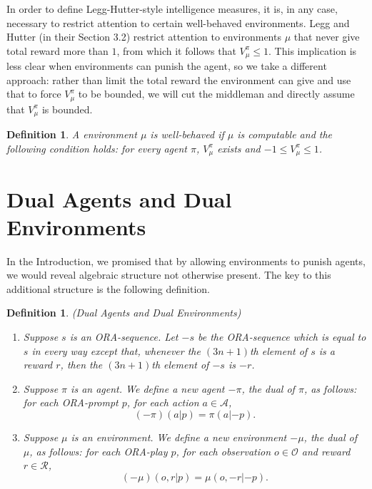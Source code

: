 \documentclass{article}
\newtheorem{definition}[theorem]{Definition}
\begin{document}
In order to define Legg-Hutter-style
intelligence measures, it is, in any case, necessary to restrict attention to
certain well-behaved environments. Legg and Hutter (in their Section 3.2)
restrict attention to environments $\mu$ that never give total reward more than $1$,
from which it follows that $V^\pi_\mu\leq 1$. This implication is less clear
when environments can punish the agent, so we take a different approach:
rather than limit the total reward the environment can give and use that to
force $V^\pi_\mu$ to be bounded, we will cut the middleman and
directly assume that $V^\pi_\mu$ is bounded.

\begin{definition}
    A environment $\mu$ is \emph{well-behaved} if $\mu$ is computable and the following
    condition holds: for every agent $\pi$, $V^\pi_\mu$ exists and
    $-1\leq V^\pi_\mu\leq 1$.
\end{definition}

\section{Dual Agents and Dual Environments}
\label{dualsection}

In the Introduction, we promised that by allowing environments to punish agents,
we would reveal algebraic structure not otherwise present. The key to this additional
structure is the following definition.

\begin{definition}
(Dual Agents and Dual Environments)
\begin{enumerate}
    \item
    Suppose $s$ is an ORA-sequence. Let $-s$
    be the ORA-sequence which is equal to $s$ in every way except that,
    whenever the $(3n+1)$th element of $s$ is a reward $r$,
    then the $(3n+1)$th element of $-s$ is $-r$.
    \item
    Suppose $\pi$ is an agent.
    We define a new agent $-\pi$, the \emph{dual} of $\pi$,
    as follows:
    for each ORA-prompt $p$, for each action $a\in\mathcal A$,
    \[(-\pi)(a|p)=\pi(a|{-p}).\]
    \item
    Suppose $\mu$ is an environment.
    We define a new environment $-\mu$, the \emph{dual} of $\mu$,
    as follows:
    for each ORA-play $p$, for each observation $o\in\mathcal O$
    and reward $r\in\mathcal R$,
    \[(-\mu)(o,r|p)=\mu(o,-r|{-p}).\]
\end{enumerate}
\end{definition}
\end{document}
